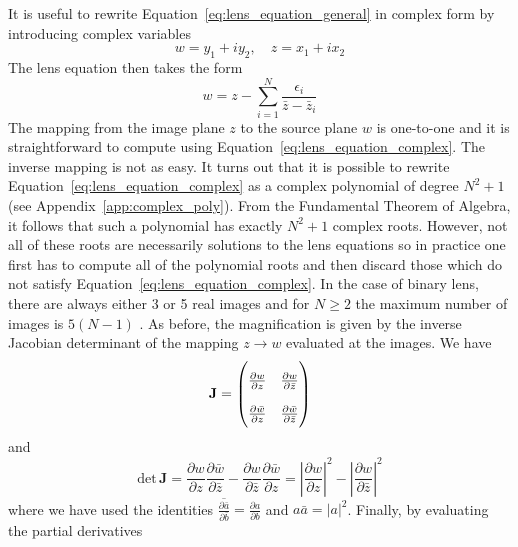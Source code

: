\documentclass[12pt]{report}
\begin{document}
It is useful to rewrite Equation~\ref{eq:lens_equation_general} in complex form
by introducing complex variables \citep{1990A&A...236..311W}
\begin{equation}
    w= y_1+iy_2,\quad z=x_1+ix_2
\end{equation}
The lens equation then takes the form
\begin{equation}
    w=z-\sum_{i=1}^N \frac{\epsilon_i}{\bar z-\bar z_i}
    \label{eq:lens_equation_complex}
\end{equation}
The mapping from the image plane $z$ to the source plane $w$ is one-to-one and it is
straightforward to compute using Equation~\ref{eq:lens_equation_complex}. The inverse
mapping is not as easy. It turns out that it is possible to rewrite Equation~\ref{eq:lens_equation_complex}
as a complex polynomial of degree $N^2 + 1$ (see Appendix~\ref{app:complex_poly}).
From the Fundamental Theorem of Algebra, it follows that such a polynomial has exactly $N^2+1$ complex roots.
However, not all of these roots are necessarily solutions to the lens equations so in practice one first has to
compute all of the polynomial roots and then discard those which do not satisfy
Equation~\ref{eq:lens_equation_complex}.
In the case of binary lens, there are always either 3 or 5 real images and for $N\geq 2$ the maximum number
of images is $5(N-1)$ \citep{arXiv:astro-ph/0103463,astro-ph/0305166,arXiv:math/0401188v2}.
As before, the magnification is given by the inverse Jacobian determinant of the mapping $z\rightarrow w$
evaluated at the images. We have
\begin{equation}
    \mathbf{J}=
    \renewcommand\arraystretch{2}
    \begin{pmatrix}
        \frac{\partial w}{\partial z} & \frac{\partial w}{\partial \bar{z}} \\ \frac{\partial \bar{w}}{\partial z} & \frac{\partial \bar{w}}{\partial \bar{z}}
    \end{pmatrix}
\end{equation}
and
\begin{equation}
    \mathrm{det}\,\mathbf{J}=\frac{\partial w}{\partial z}\frac{\partial \bar{w}}{\partial \bar{z}} - \frac{\partial w}{\partial \bar{z}}\frac{\partial \bar{w}}{\partial z} = \left|\frac{\partial w}{\partial z}\right|^2 - \left|\frac{\partial w}{\partial \bar{z}}\right|^2
\end{equation}
where we have used the identities
$\overline{\frac{\partial\bar a}{\partial{\bar b}}}=\frac{\partial a}{\partial{b}}$ and $a\bar a=|a|^2$. Finally, by evaluating the partial derivatives
\end{document}
